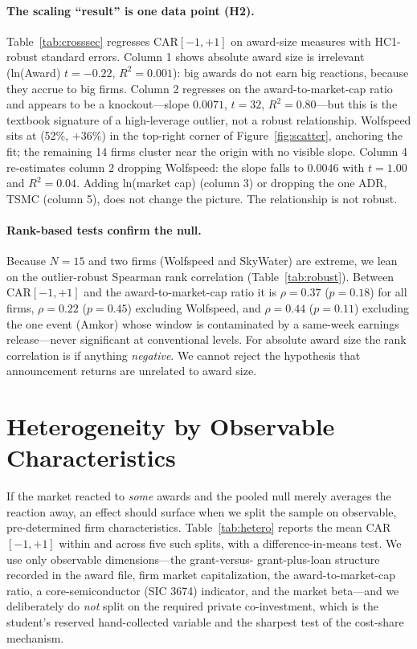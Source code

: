 \documentclass[12pt]{article}
\begin{document}
\paragraph{The scaling ``result'' is one data point (H2).} Table~\ref{tab:crosssec} regresses
CAR$[-1,+1]$ on award-size measures with HC1-robust standard errors. Column 1 shows absolute
award size is irrelevant (ln(Award) $t=-0.22$, $R^2=0.001$): big awards do not earn big
reactions, because they accrue to big firms. Column 2 regresses on the award-to-market-cap
ratio and appears to be a knockout---slope $0.0071$, $t=32$, $R^2=0.80$---but this is the
textbook signature of a high-leverage outlier, not a robust relationship. Wolfspeed sits at
(52\%, $+36\%$) in the top-right corner of Figure~\ref{fig:scatter}, anchoring the fit;
the remaining 14 firms cluster near the origin with no visible slope. Column 4 re-estimates
column 2 dropping Wolfspeed: the slope falls to $0.0046$ with $t=1.00$ and $R^2=0.04$.
Adding ln(market cap) (column 3) or dropping the one ADR, TSMC (column 5), does not change
the picture. The relationship is not robust.

\paragraph{Rank-based tests confirm the null.} Because $N=15$ and two firms (Wolfspeed and
SkyWater) are extreme, we lean on the outlier-robust Spearman rank correlation
(Table~\ref{tab:robust}). Between CAR$[-1,+1]$ and the award-to-market-cap ratio it is
$\rho=0.37$ ($p=0.18$) for all firms, $\rho=0.22$ ($p=0.45$) excluding Wolfspeed, and
$\rho=0.44$ ($p=0.11$) excluding the one event (Amkor) whose window is contaminated by a
same-week earnings release---never significant at conventional levels. For absolute award
size the rank correlation is if anything \emph{negative}. We cannot reject the hypothesis
that announcement returns are unrelated to award size.

\section{Heterogeneity by Observable Characteristics}\label{sec:het}
If the market reacted to \emph{some} awards and the pooled null merely averages the reaction
away, an effect should surface when we split the sample on observable, pre-determined firm
characteristics. Table~\ref{tab:hetero} reports the mean CAR$[-1,+1]$ within and across five such
splits, with a difference-in-means test. We use only observable dimensions---the grant-versus-
grant-plus-loan structure recorded in the award file, firm market capitalization, the
award-to-market-cap ratio, a core-semiconductor (SIC 3674) indicator, and the market beta---and we
deliberately do \emph{not} split on the required private co-investment, which is the student's
reserved hand-collected variable and the sharpest test of the cost-share mechanism.
\end{document}
